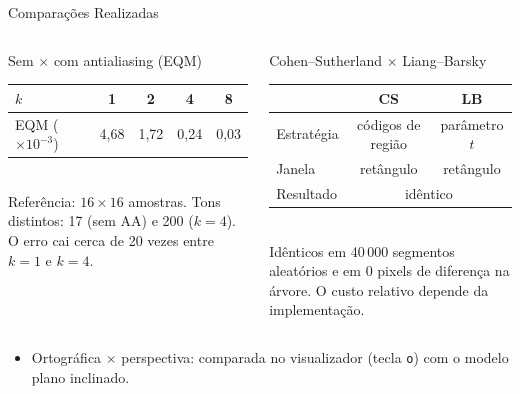 \documentclass[aspectratio=169,11pt]{beamer}
\begin{document}
\begin{frame}{Comparações Realizadas}
\begin{columns}[T]
\begin{block}{Sem $\times$ com antialiasing (EQM)}
\small
\begin{tabular}{lcccc}
\toprule
$k$ & 1 & 2 & 4 & 8\\
\midrule
EQM ($\times10^{-3}$) & 4,68 & 1,72 & 0,24 & 0,03\\
\bottomrule
\end{tabular}\\[0.15cm]
Referência: $16\times16$ amostras. Tons distintos: 17 (sem AA) e 200 ($k=4$). O erro cai cerca de 20 vezes entre $k=1$ e $k=4$.
\end{block}

\begin{block}{Cohen--Sutherland $\times$ Liang--Barsky}
\small
\begin{tabular}{lcc}
\toprule
& CS & LB\\
\midrule
Estratégia & códigos de região & parâmetro $t$\\
Janela & retângulo & retângulo\\
Resultado & \multicolumn{2}{c}{idêntico}\\
\bottomrule
\end{tabular}\\[0.15cm]
Idênticos em 40\,000 segmentos aleatórios e em 0 pixels de diferença na árvore. O custo relativo depende da implementação.
\end{block}
\end{columns}

\vspace{0.1cm}
\small
\begin{itemize}
  \item Ortográfica $\times$ perspectiva: comparada no visualizador (tecla \texttt{o}) com o modelo plano inclinado.
\end{itemize}
\end{frame}
\end{document}
